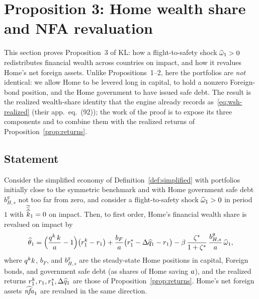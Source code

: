 \section{Proposition 3: Home wealth share and NFA revaluation}
\label{sec:prop3}

This section proves Proposition~3 of KL: how a flight-to-safety shock
$\widehat{\omega}_1>0$ redistributes financial wealth across countries on impact, and
how it revalues Home's net foreign assets. Unlike Propositions~1--2, here the
portfolios are \emph{not} identical: we allow Home to be levered long in capital,
to hold a nonzero Foreign-bond position, and the Home government to have issued
safe debt. The result is the realized wealth-share identity that the engine
already records as~\eqref{eq:wsh-realized} (their app.~eq.~(92)); the work of the
proof is to expose its three components and to combine them with the realized
returns of Proposition~\ref{prop:returns}.

\subsection{Statement}

\begin{proposition}
\label{prop:wealth}
Consider the simplified economy of Definition~\ref{def:simplified} with portfolios
initially close to the symmetric benchmark and with Home government safe debt
$b^g_{H,s}$ not too far from zero, and consider a flight-to-safety shock
$\widehat{\omega}_1>0$ in period~$1$ with $\widetilde{\widetilde{\widehat{k}}}_1=0$ on
impact. Then, to first order, Home's financial wealth share is revalued on impact
by
\begin{equation}
\widehat{\theta}_1 = \Bigl(\frac{q^{k}\,k}{a}-1\Bigr)\bigl(r^{k}_1-r_1\bigr)
+\frac{b_F}{a}\bigl(r^{*}_1-\Delta\widehat{q}_1-r_1\bigr)
-\beta\,\frac{\zeta^{*}}{1+\zeta^{*}}\,\frac{b^g_{H,s}}{a}\,\widehat{\omega}_1, \label{eq:prop3-wsh}
\end{equation}
where $q^{k} k$, $b_F$, and $b^g_{H,s}$ are the steady-state Home positions in
capital, Foreign bonds, and government safe debt (as shares of Home saving
$a$), and the realized returns $r^{k}_1,r_1,r^{*}_1,\Delta\widehat{q}_1$ are those
of Proposition~\ref{prop:returns}. Home's net foreign assets $\widehat{\mathit{nfa}}_1$
are revalued in the same direction.
\end{proposition}

